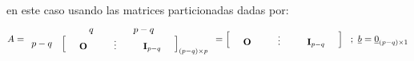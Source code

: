 \documentclass[
]{book}
\theoremstyle{definition}
\theoremstyle{definition}
\theoremstyle{definition}
\theoremstyle{definition}
\theoremstyle{remark}
\begin{document}
en este caso usando las matrices particionadas dadas por:
\[
 A=\begin{array}{cc}
 &\hspace{0.5cm}  q \hspace{1.5cm}  p-q \hspace{1.5cm} \\
 p-q & \begin{bmatrix}
\hspace{0.5cm} \mathbf{O} \hspace{1.0cm} \vdots \hspace{1.0cm} \mathbf{I}_{p-q} \hspace{0.5cm}
 \end{bmatrix}_{(p-q)\times p}
\end{array}=\begin{bmatrix}
\hspace{0.5cm} \mathbf{O} \hspace{1.0cm} \vdots \hspace{1.0cm} \mathbf{I}_{p-q} \hspace{0.5cm}
 \end{bmatrix}\ \ ; \ \underline{b}=\underline{0}_{(p-q)\times 1}
\]
\end{document}
